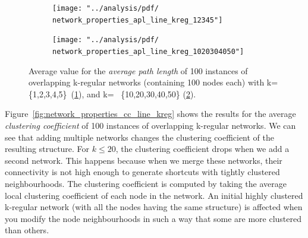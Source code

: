 \documentclass[preprint,number]{elsarticle}
\begin{document}
\begin{figure}[H]
	\centering
	\begin{subfigure}{.5\linewidth}
		\centering
		\texttt{[image: "../analysis/pdf/ network\_properties\_apl\_line\_kreg\_12345"]}
		\caption{}
		\label{fig:network_properties_apl_line_kreg_12345}
	\end{subfigure}%
	\begin{subfigure}{.5\linewidth}
		\centering
		\texttt{[image: "../analysis/pdf/ network\_properties\_apl\_line\_kreg\_1020304050"]}
		\caption{}
		\label{fig:network_properties_apl_line_kreg_1020304050}
	\end{subfigure}
	\begin{minipage}{0.9\textwidth}
		\vspace{0.2cm}
		\caption{Average value for the \textit{average path length} of 100 instances of overlapping k-regular networks (containing 100 nodes each) with k=\{1,2,3,4,5\}~(\ref{fig:network_properties_apl_line_kreg_12345}), and k= ~\{10,20,30,40,50\} (\ref{fig:network_properties_apl_line_kreg_1020304050}).}
		\label{fig:network_properties_apl_line_kreg}
	\end{minipage}
\end{figure}

\noindent Figure~\ref{fig:network_properties_cc_line_kreg} shows the results for the average \textit{clustering coefficient} of 100 instances of overlapping k-regular networks. We can see that adding multiple networks changes the clustering coefficient of the resulting structure. For $k \le 20$, the clustering coefficient drops when we add a second network. This happens because when we merge these networks, their connectivity is not high enough to generate shortcuts with tightly clustered neighbourhoods. The clustering coefficient is computed by taking the average local clustering coefficient of each node in the network. An initial highly clustered k-regular network (with all the nodes having the same structure) is affected when you modify the node neighbourhoods in such a way that some are more clustered than others.
\end{document}
